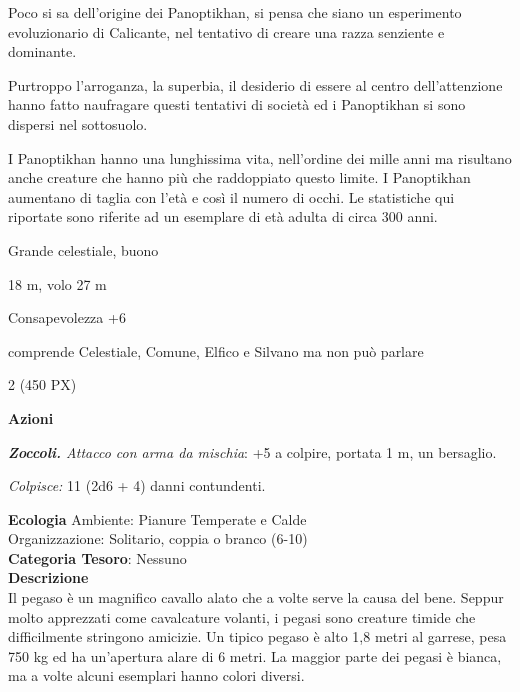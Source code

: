 \begin{multicols}{2}
{Poco si sa dell'origine dei Panoptikhan, si pensa che siano un esperimento evoluzionario di Calicante, nel tentativo di creare una razza senziente e dominante.

Purtroppo l'arroganza, la superbia, il desiderio di essere al centro dell'attenzione hanno fatto naufragare questi tentativi di società ed i Panoptikhan si sono dispersi nel sottosuolo.

I Panoptikhan hanno una lunghissima vita, nell'ordine dei mille anni ma risultano anche creature che hanno più che raddoppiato questo limite. I Panoptikhan aumentano di taglia con l'età e così il numero di occhi. Le statistiche qui riportate sono riferite ad un esemplare di età adulta di circa 300 anni.

\begin{description}[noitemsep, topsep=0pt, parsep=0pt, partopsep=0pt, itemsep=1pt, leftmargin=2.35cm,  labelwidth=2.2cm, itemindent=0cm, listparindent=0pt] %
\setlength{\baselineskip}{10pt}
\item[\textbf{Taglia/Tipo}] Grande celestiale, buono
\item[\textbf{Caratt.}] 
\item[\textbf{Punti Ferita}] 
\item[\textbf{Movimento}] 18 m, volo 27 m
\item[\textbf{Tiri Salvez.}] 
\item[\textbf{Comp.}] Consapevolezza +6
\item[\textbf{Linguaggi}] comprende Celestiale, Comune, Elfico e Silvano ma non può parlare
\item[\textbf{Sfida}] 2 (450 PX)
\end{description}
\smallskip

\textbf{Azioni}

\emph{\textbf{Zoccoli.} Attacco con arma da mischia}: +5 a colpire, portata 1 m, un bersaglio.

\emph{Colpisce:} 11 (2d6 + 4) danni contundenti.

\textbf{Ecologia}
Ambiente: Pianure Temperate e Calde\\
Organizzazione: Solitario, coppia o branco (6-10)\\
\textbf{Categoria Tesoro}: Nessuno\\
\textbf{Descrizione}\\
Il pegaso è un magnifico cavallo alato che a volte serve la causa del bene. Seppur molto apprezzati come cavalcature volanti, i pegasi sono creature timide che difficilmente stringono amicizie. Un tipico pegaso è alto 1,8 metri al garrese, pesa 750 kg ed ha un'apertura alare di 6 metri. La maggior parte dei pegasi è bianca, ma a volte alcuni esemplari hanno colori diversi.

}
\end{multicols}
